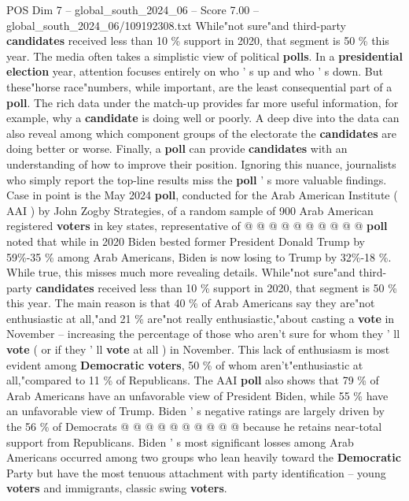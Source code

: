 \begin{textsample}{POS Dim 7 – global\_south\_2024\_06 – Score 7.00 – global\_south\_2024\_06/109192308.txt}  \label{ex:f7_pos_238}
While"not sure"and third-party \textbf{candidates} received less than 10 \% support in 2020, that segment is 50 \% this year.
The media often takes a simplistic view of political \textbf{polls}.
In a \textbf{presidential} \textbf{election} year, attention focuses entirely on who ' s up and who ' s down.
But these"horse race"numbers, while important, are the least consequential part of a \textbf{poll}.
The rich data under the match-up provides far more useful information, for example, why a \textbf{candidate} is doing well or poorly.
A deep dive into the data can also reveal among which component groups of the electorate the \textbf{candidates} are doing better or worse.
Finally, a \textbf{poll} can provide \textbf{candidates} with an understanding of how to improve their position.
Ignoring this nuance, journalists who simply report the top-line results miss the \textbf{poll} ' s more valuable findings.
Case in point is the May 2024 \textbf{poll}, conducted for the Arab American Institute ( AAI ) by John Zogby Strategies, of a random sample of 900 Arab American registered \textbf{voters} in key states, representative of @ @ @ @ @ @ @ @ @ @ \textbf{poll} noted that while in 2020 Biden bested former President Donald Trump by 59\%-35 \% among Arab Americans, Biden is now losing to Trump by 32\%-18 \%.
While true, this misses much more revealing details.
While"not sure"and third-party \textbf{candidates} received less than 10 \% support in 2020, that segment is 50 \% this year.
The main reason is that 40 \% of Arab Americans say they are"not enthusiastic at all,"and 21 \% are"not really enthusiastic,"about casting a \textbf{vote} in November -- increasing the percentage of those who aren't sure for whom they ' ll \textbf{vote} ( or if they ' ll \textbf{vote} at all ) in November.
This lack of enthusiasm is most evident among \textbf{Democratic} \textbf{voters}, 50 \% of whom aren't"enthusiastic at all,"compared to 11 \% of Republicans.
The AAI \textbf{poll} also shows that 79 \% of Arab Americans have an unfavorable view of President Biden, while 55 \% have an unfavorable view of Trump.
Biden ' s negative ratings are largely driven by the 56 \% of Democrats @ @ @ @ @ @ @ @ @ @ because he retains near-total support from Republicans.
Biden ' s most significant losses among Arab Americans occurred among two groups who lean heavily toward the \textbf{Democratic} Party but have the most tenuous attachment with party identification -- young \textbf{voters} and immigrants, classic swing \textbf{voters}.

\end{textsample}
